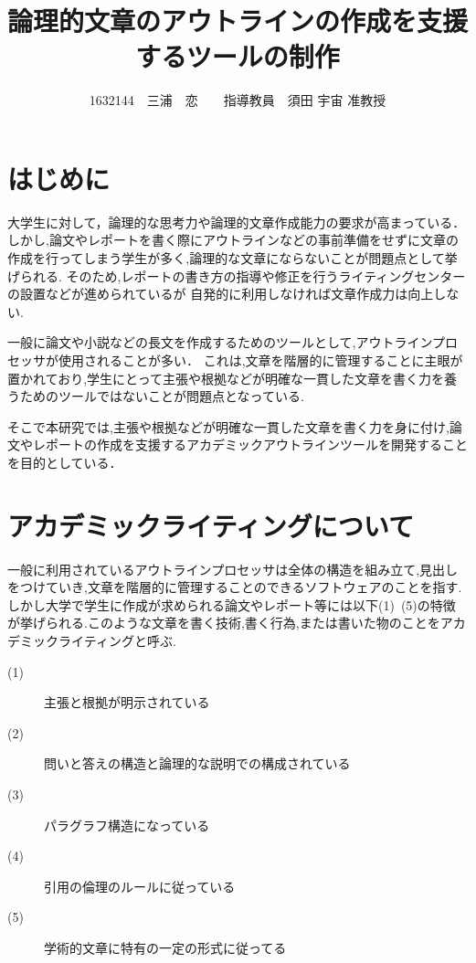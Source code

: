 \documentclass[twocolumn,10pt,a4j]{jsarticle}
\title{論理的文章のアウトラインの作成を支援するツールの制作}
\author{1632144　三浦　恋　　指導教員　須田 宇宙 准教授}
\date{}
\begin{document}
\maketitle

\section{はじめに}

大学生に対して，論理的な思考力や論理的文章作成能力の要求が高まっている．
しかし,論文やレポートを書く際にアウトラインなどの事前準備をせずに文章の作成を行ってしまう学生が多く,論理的な文章にならないことが問題点として挙げられる.
そのため,レポートの書き方の指導や修正を行うライティングセンターの設置などが進められているが
自発的に利用しなければ文章作成力は向上しない.

一般に論文や小説などの長文を作成するためのツールとして,アウトラインプロセッサが使用されることが多い．
これは,文章を階層的に管理することに主眼が置かれており,学生にとって主張や根拠などが明確な一貫した文章を書く力を養うためのツールではないことが問題点となっている.

そこで本研究では,主張や根拠などが明確な一貫した文章を書く力を身に付け,論文やレポートの作成を支援するアカデミックアウトラインツールを開発することを目的としている．

\section{アカデミックライティングについて}
一般に利用されているアウトラインプロセッサは全体の構造を組み立て,見出しをつけていき,文章を階層的に管理することのできるソフトウェアのことを指す.
しかし大学で学生に作成が求められる論文やレポート等には以下(1)~(5)の特徴が挙げられる.このような文章を書く技術,書く行為,または書いた物のことをアカデミックライティングと呼ぶ\cite{ren01}.

\begin{description}
  \item[(1)] 主張と根拠が明示されている
  \item[(2)] 問いと答えの構造と論理的な説明での構成されている
  \item[(3)] パラグラフ構造になっている
  \item[(4)] 引用の倫理のルールに従っている
  \item[(5)] 学術的文章に特有の一定の形式に従ってる
\end{description}
\end{document}

